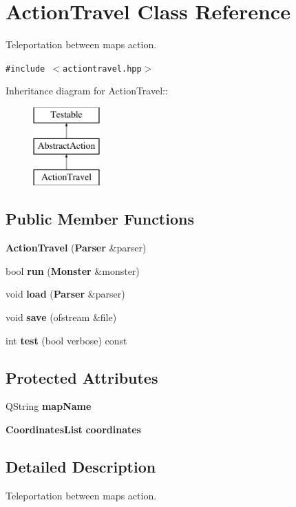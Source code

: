 \section{Action\-Travel Class Reference}
\label{classActionTravel}
Teleportation between maps action.  


{\tt \#include $<$actiontravel.hpp$>$}

Inheritance diagram for Action\-Travel::\begin{figure}[H]
\begin{center}
\leavevmode
\includegraphics[height=3cm]{classActionTravel}
\end{center}
\end{figure}
\subsection*{Public Member Functions}
\begin{CompactItemize}
\item 
{\bf Action\-Travel} ({\bf Parser} \&parser)
\item 
bool {\bf run} ({\bf Monster} \&monster)
\item 
void {\bf load} ({\bf Parser} \&parser)
\item 
void {\bf save} (ofstream \&file)
\item 
int {\bf test} (bool verbose) const 
\end{CompactItemize}
\subsection*{Protected Attributes}
\begin{CompactItemize}
\item 
QString {\bf map\-Name}
\item 
{\bf Coordinates\-List} {\bf coordinates}
\end{CompactItemize}


\subsection{Detailed Description}
Teleportation between maps action. 



